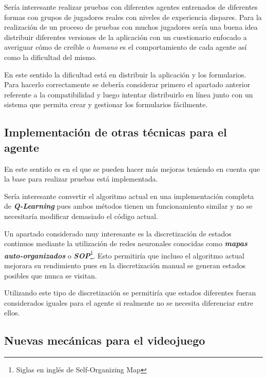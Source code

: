 Sería interesante realizar pruebas con diferentes agentes entrenados de diferentes formas con grupos de jugadores reales con niveles de experiencia dispares. Para la realización de un proceso de pruebas con muchos jugadores sería una buena idea distribuir diferentes versiones de la aplicación con un cuestionario enfocado a averiguar cómo de creíble o \textit{humano} es el comportamiento de cada agente así como la dificultad del mismo.

\bigskip

En este sentido la dificultad está en distribuir la aplicación y los formularios. Para hacerlo correctamente se debería considerar primero el apartado anterior referente a la compatibilidad y luego intentar distribuirlo en línea junto con un sistema que permita crear y gestionar los formularios fácilmente.

\subsection{Implementación de otras técnicas para el agente}

En este sentido es en el que se pueden hacer más mejoras teniendo en cuenta que la base para realizar pruebas está implementada.

\bigskip

Sería interesante convertir el algoritmo actual en una implementación completa de \textbf{\textit{Q-Learning}} pues ambos métodos tienen un funcionamiento similar y no se necesitaría modificar demasiado el código actual.

\bigskip

Un apartado considerado muy interesante es la discretización de estados continuos mediante la utilización de redes neuronales conocidas como \textit{\textbf{mapas auto-organizados}} o \textbf{\textit{SOP}}\footnote{Siglas en inglés de Self-Organizing Map}. Esto permitiría que incluso el algoritmo actual mejorara su rendimiento pues en la discretización manual se generan estados posibles que nunca se visitan.

\bigskip

Utilizando este tipo de discretización se permitiría que estados diferentes fueran considerados iguales para el agente si realmente no se necesita diferenciar entre ellos.

\subsection{Nuevas mecánicas para el videojuego}

